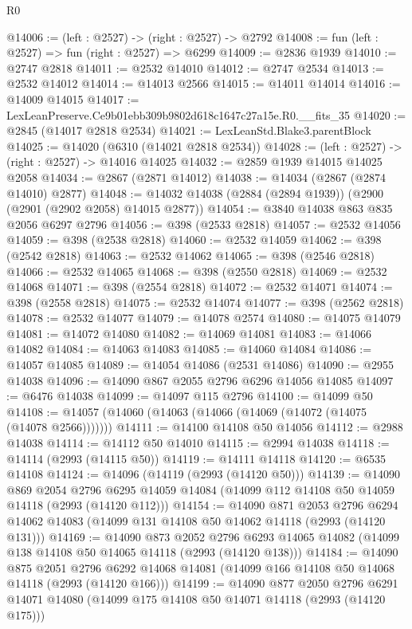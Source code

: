 \begin{lexlean}{R0}
\begin{coremodule}
@14006 := (left : @2527) -> (right : @2527) -> @2792
@14008 := fun (left : @2527) => fun (right : @2527) => @6299
@14009 := @2836 @1939
@14010 := @2747 @2818
@14011 := @2532 @14010
@14012 := @2747 @2534
@14013 := @2532 @14012
@14014 := @14013 @2566
@14015 := @14011 @14014
@14016 := @14009 @14015
@14017 := LexLeanPreserve.Ce9b01ebb309b9802d618c1647c27a15e.R0.__fits_35
@14020 := @2845 (@14017 @2818 @2534)
@14021 := LexLeanStd.Blake3.parentBlock
@14025 := @14020 (@6310 (@14021 @2818 @2534))
@14028 := (left : @2527) -> (right : @2527) -> @14016 @14025
@14032 := @2859 @1939 @14015 @14025 @2058
@14034 := @2867 (@2871 @14012)
@14038 := @14034 (@2867 (@2874 @14010) @2877)
@14048 := @14032 @14038 (@2884 (@2894 @1939)) (@2900 (@2901 (@2902 @2058) @14015 @2877))
@14054 := @3840 @14038 @863 @835 @2056 @6297 @2796
@14056 := @398 (@2533 @2818)
@14057 := @2532 @14056
@14059 := @398 (@2538 @2818)
@14060 := @2532 @14059
@14062 := @398 (@2542 @2818)
@14063 := @2532 @14062
@14065 := @398 (@2546 @2818)
@14066 := @2532 @14065
@14068 := @398 (@2550 @2818)
@14069 := @2532 @14068
@14071 := @398 (@2554 @2818)
@14072 := @2532 @14071
@14074 := @398 (@2558 @2818)
@14075 := @2532 @14074
@14077 := @398 (@2562 @2818)
@14078 := @2532 @14077
@14079 := @14078 @2574
@14080 := @14075 @14079
@14081 := @14072 @14080
@14082 := @14069 @14081
@14083 := @14066 @14082
@14084 := @14063 @14083
@14085 := @14060 @14084
@14086 := @14057 @14085
@14089 := @14054 @14086 (@2531 @14086)
@14090 := @2955 @14038
@14096 := @14090 @867 @2055 @2796 @6296 @14056 @14085
@14097 := @6476 @14038
@14099 := @14097 @115 @2796
@14100 := @14099 @50
@14108 := @14057 (@14060 (@14063 (@14066 (@14069 (@14072 (@14075 (@14078 @2566)))))))
@14111 := @14100 @14108 @50 @14056
@14112 := @2988 @14038
@14114 := @14112 @50 @14010
@14115 := @2994 @14038
@14118 := @14114 (@2993 (@14115 @50))
@14119 := @14111 @14118
@14120 := @6535 @14108
@14124 := @14096 (@14119 (@2993 (@14120 @50)))
@14139 := @14090
    @869
    @2054
    @2796
    @6295
    @14059
    @14084
    (@14099 @112 @14108 @50 @14059 @14118 (@2993 (@14120 @112)))
@14154 := @14090
    @871
    @2053
    @2796
    @6294
    @14062
    @14083
    (@14099 @131 @14108 @50 @14062 @14118 (@2993 (@14120 @131)))
@14169 := @14090
    @873
    @2052
    @2796
    @6293
    @14065
    @14082
    (@14099 @138 @14108 @50 @14065 @14118 (@2993 (@14120 @138)))
@14184 := @14090
    @875
    @2051
    @2796
    @6292
    @14068
    @14081
    (@14099 @166 @14108 @50 @14068 @14118 (@2993 (@14120 @166)))
@14199 := @14090
    @877
    @2050
    @2796
    @6291
    @14071
    @14080
    (@14099 @175 @14108 @50 @14071 @14118 (@2993 (@14120 @175)))

\end{coremodule}
\end{lexlean}

